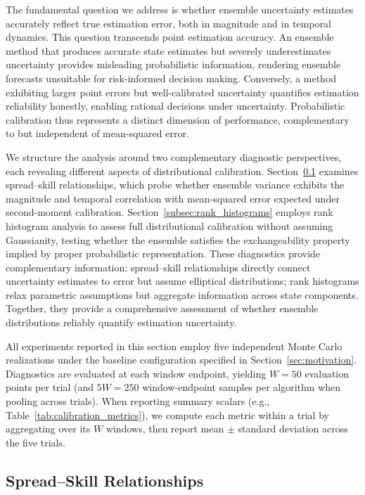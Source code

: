 \documentclass[11pt,a4paper]{article}
\begin{document}
The fundamental question we address is whether ensemble uncertainty estimates accurately reflect true estimation error, both in magnitude and in temporal dynamics. This question transcends point estimation accuracy. An ensemble method that produces accurate state estimates but severely underestimates uncertainty provides misleading probabilistic information, rendering ensemble forecasts unsuitable for risk-informed decision making. Conversely, a method exhibiting larger point errors but well-calibrated uncertainty quantifies estimation reliability honestly, enabling rational decisions under uncertainty. Probabilistic calibration thus represents a distinct dimension of performance, complementary to but independent of mean-squared error.

We structure the analysis around two complementary diagnostic perspectives, each revealing different aspects of distributional calibration. Section~\ref{subsec:spread_skill} examines spread--skill relationships, which probe whether ensemble variance exhibits the magnitude and temporal correlation with mean-squared error expected under second-moment calibration. Section~\ref{subsec:rank_histograms} employs rank histogram analysis to assess full distributional calibration without assuming Gaussianity, testing whether the ensemble satisfies the exchangeability property implied by proper probabilistic representation. These diagnostics provide complementary information: spread--skill relationships directly connect uncertainty estimates to error but assume elliptical distributions; rank histograms relax parametric assumptions but aggregate information across state components. Together, they provide a comprehensive assessment of whether ensemble distributions reliably quantify estimation uncertainty.

All experiments reported in this section employ five independent Monte Carlo realizations under the baseline configuration specified in Section~\ref{sec:motivation}. Diagnostics are evaluated at each window endpoint, yielding $W=50$ evaluation points per trial (and $5W=250$ window-endpoint samples per algorithm when pooling across trials). When reporting summary scalars (e.g., Table~\ref{tab:calibration_metrics}), we compute each metric within a trial by aggregating over its $W$ windows, then report mean $\pm$ standard deviation across the five trials.



\subsection{Spread--Skill Relationships}\label{subsec:spread_skill}
\end{document}
